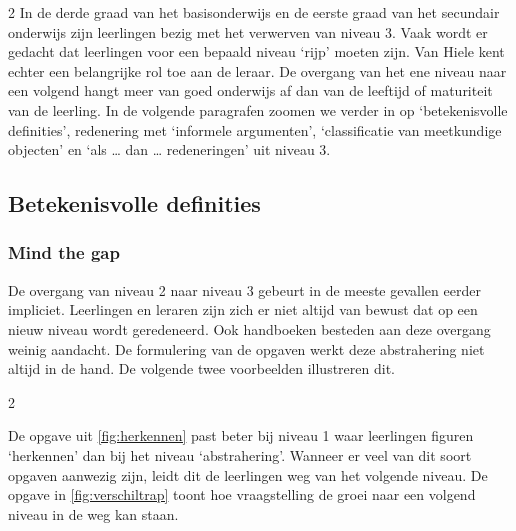 \begin{multicols}{2}
In de derde graad van het basisonderwijs en de eerste graad van het secundair onderwijs zijn leerlingen bezig met het verwerven van niveau 3.
Vaak wordt er gedacht dat leerlingen voor een bepaald niveau `rijp' moeten zijn.
Van Hiele kent echter een belangrijke rol toe aan de leraar.
De overgang van het ene niveau naar een volgend hangt meer van goed onderwijs af dan van de leeftijd of maturiteit van de leerling.
In de volgende paragrafen zoomen we verder in op `betekenisvolle definities', redenering met `informele argumenten', `classificatie van meetkundige objecten' en `als \ldots{} dan \ldots{} redeneringen' uit niveau 3.

\subsection{Betekenisvolle definities}\label{betekenisvolle-definities}

\subsubsection*{Mind the gap}
De overgang van niveau 2 naar niveau 3 gebeurt in de meeste gevallen eerder impliciet.
Leerlingen en leraren zijn zich er niet altijd van bewust dat op een nieuw niveau wordt geredeneerd.
Ook handboeken besteden aan deze overgang weinig aandacht.
De formulering van de opgaven werkt deze abstrahering niet altijd in de hand.
De volgende twee voorbeelden illustreren dit.
\end{multicols}
\begin{multicols}{2}

De opgave uit \autoref{fig:herkennen} past beter bij niveau 1 waar leerlingen figuren `herkennen' dan bij het niveau `abstrahering'.
Wanneer er veel van dit soort opgaven aanwezig zijn, leidt dit de leerlingen weg van het volgende niveau.
De opgave in \autoref{fig:verschiltrap} toont hoe vraagstelling de groei naar een volgend niveau in de weg kan staan.

\end{multicols}
